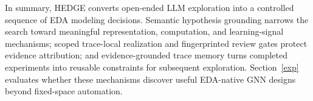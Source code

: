 In summary, HEDGE converts open-ended LLM exploration into a controlled sequence of EDA modeling decisions. Semantic hypothesis grounding narrows the search toward meaningful representation, computation, and learning-signal mechanisms; scoped trace-local realization and fingerprinted review gates protect evidence attribution; and evidence-grounded trace memory turns completed experiments into reusable constraints for subsequent exploration. Section~\ref{exp} evaluates whether these mechanisms discover useful EDA-native GNN designs beyond fixed-space automation.
